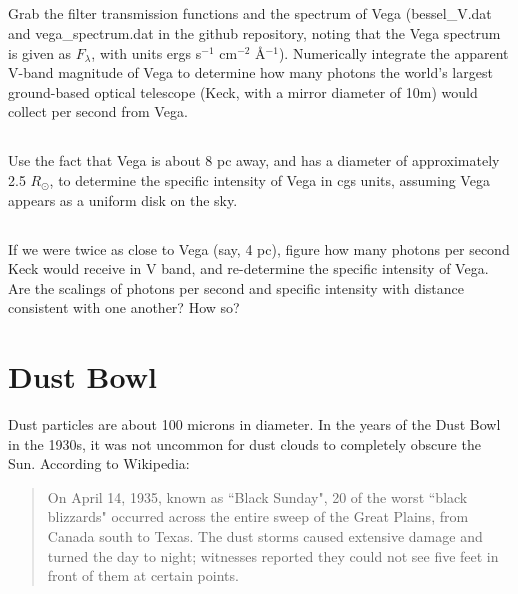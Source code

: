 \documentclass[11pt]{article}
\begin{document}
\subsection{}
\vspace{-6pt}
Grab the filter transmission functions and the spectrum of Vega
(bessel\_V.dat and vega\_spectrum.dat in the github repository, noting that
the Vega spectrum is given as $F_\lambda$, with units ergs s$^{-1}$ cm$^{-2}$ \AA$^{-1}$).
Numerically integrate the apparent V-band magnitude of Vega to determine how many
photons the world's largest ground-based optical telescope (Keck, with a mirror diameter of 10m)
would collect per second from Vega.

\subsection{}
\vspace{-6pt}
Use the fact that Vega is about 8 pc away, and has a diameter of approximately 2.5 $R_\odot$, to
determine the specific intensity of Vega in cgs units, assuming Vega appears as a uniform disk on the sky.

\subsection{}
\vspace{-6pt}
If we were twice as close to Vega (say, 4 pc), figure how many photons per second Keck would receive
in V band, and re-determine the specific intensity of Vega.  Are the scalings of photons per second and
specific intensity with distance consistent with one another?  How so?

\section{Dust Bowl}
\vspace{-6pt}

Dust particles are about 100 microns in diameter.  In the years of the Dust
Bowl in the 1930s, it was not uncommon for dust clouds to completely obscure
the Sun.  According to Wikipedia:
\begin{quote}
On April 14, 1935, known as ``Black Sunday", 20 of the worst ``black
blizzards" occurred across the entire sweep of the Great Plains, from Canada
south to Texas. The dust storms caused extensive damage and turned the day to
night; witnesses reported they could not see five feet in front of them at
certain points.
\end{quote}
\end{document}
